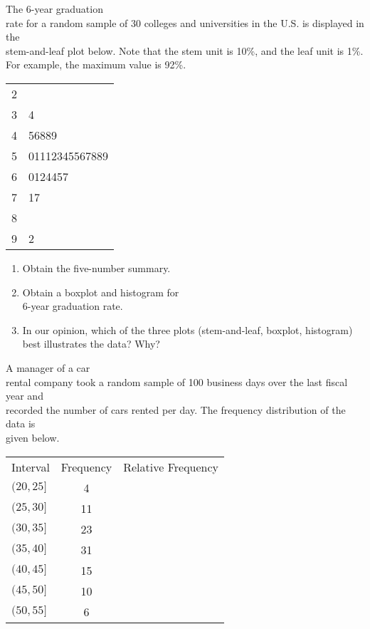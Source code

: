 \documentclass[11pt]{book}\usepackage[]{graphicx}\usepackage[]{color}
\begin{document}
\begin{exercises}
  \begin{exercise} %

The 6-year graduation \\ rate for a random sample of 30 colleges and universities
in the U.S. is displayed in the \\ stem-and-leaf plot below.  Note that the stem unit is 10\%, and the leaf unit is 1\%.  For example, the maximum value is 92\%.

\begin{table}[ht]
\centering
{\small{
\begin{tabular}{@{} r|l @{}} \hline
2 & \\
3 & 4 \\
4 & 56889 \\
5 & 01112345567889 \\
6 & 0124457 \\
7 & 17 \\
8 & \\
9 & 2 \\ \hline
\end{tabular}
}}
\end{table}

	  \begin{enumerate}
	  \item Obtain the five-number summary.
    \item Obtain a boxplot and histogram for \\ 6-year graduation rate.
    \item In our opinion, which of the three plots (stem-and-leaf, boxplot, histogram) \\ best illustrates the data? Why?
	  \end{enumerate}

	\end{exercise}



  \begin{exercise} %

A manager of a car \\ rental company took a random sample of 100 business days over the last fiscal year and \\ recorded the number of cars rented per day.  The frequency distribution of the data is \\ given below.

{\small{
\begin{tabular}{@{} lcc @{}} \hline
Interval  &  Frequency &	Relative Frequency \\
$(20, 25]$ 	&      4 \\
$(25, 30]$ 	&    11  \\
$(30, 35]$ 	&    23 \\
$(35, 40]$ 	&    31 \\
$(40, 45]$ 	&    15 \\
$(45, 50]$ 	&    10 \\
$(50, 55]$ 	&      6 \\ \hline
\end{tabular}  }}


\end{exercise}
\end{exercises}
\end{document}
